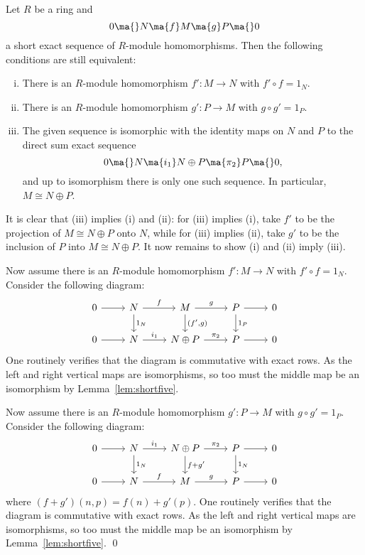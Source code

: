 \begin{thm}\label{thm:splitseq}
Let $R$ be a ring and
	\[
	0 \ma{} N \ma{f} M \ma{g} P \ma{} 0
	\]
a short exact sequence of $R$-module homomorphisms. Then the following conditions are still equivalent:
	\begin{enumerate}[(i)]
	\item There is an $R$-module homomorphism $f': M \rightarrow N$ with $f' \circ f=1_N$.
	\item There is an $R$-module homomorphism $g': P \rightarrow M$ with $g \circ g'=1_P$.
	\item The given sequence is isomorphic with the identity maps on $N$ and $P$ to the direct sum exact sequence
	\[
	0 \ma{} N \ma{i_1} N \oplus P \ma{\pi_2} P \ma{} 0,
	\]
and up to isomorphism there is only one such sequence. In particular, $M \cong N \oplus P$.
	\end{enumerate}
\end{thm}

\pf It is clear that (iii) implies (i) and (ii): for (iii) implies (i), take $f'$ to be the projection of $M \cong N \oplus P$ onto $N$, while for (iii) implies (ii), take $g'$ to be the inclusion of $P$ into $M \cong N \oplus P$. It now remains to show (i) and (ii) imply (iii). 

Now assume there is an $R$-module homomorphism $f': M \rightarrow N$ with $f' \circ f=1_N$. Consider the following diagram:
	\[
	\begin{tikzcd}
	0 \arrow{r} & N \arrow{r}{f} \arrow{d}{1_N} & M \arrow{d}{(f',g)} \arrow{r}{g} & P \arrow{d}{1_P} \arrow{r} & 0 \\
	0 \arrow{r} & N \arrow{r}{i_1} & N \oplus P \arrow{r}{\pi_2} & P \arrow{r} & 0
	\end{tikzcd}
	\]
One routinely verifies that the diagram is commutative with exact rows. As the left and right vertical maps are isomorphisms, so too must the middle map be an isomorphism by Lemma~\ref{lem:shortfive}.

Now assume there is an $R$-module homomorphism $g': P \rightarrow M$ with $g \circ g'=1_P$. Consider the following diagram:
	\[
	\begin{tikzcd}
	0 \arrow{r} & N \arrow{d}{1_N} \arrow{r}{i_1} & N \oplus P \arrow{d}{f+g'} \arrow{r}{\pi_2} & P \arrow{r} \arrow{d}{1_N} & 0 \\
	0 \arrow{r} & N \arrow{r}{f} & M \arrow{r}{g} & P \arrow{r} & 0
	\end{tikzcd}
	\]
where $(f+g')(n,p)=f(n)+g'(p)$. One routinely verifies that the diagram is commutative with exact rows. As the left and right vertical maps are isomorphisms, so too must the middle map be an isomorphism by Lemma~\ref{lem:shortfive}. \qed \\ 


